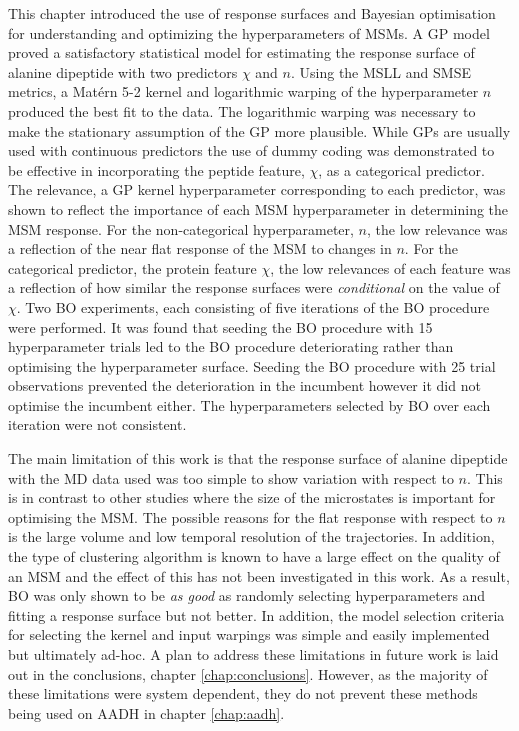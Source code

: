 This chapter introduced the use of response surfaces and Bayesian optimisation for understanding and optimizing the hyperparameters of MSMs. A GP model proved a satisfactory statistical model for estimating the response surface of alanine dipeptide with two predictors $\chi$ and $n$. Using the MSLL and SMSE metrics, a Mat\'{e}rn 5-2 kernel and logarithmic warping of the hyperparameter $n$ produced the best fit to the data.  The logarithmic warping was necessary to make the stationary assumption of the GP more plausible. While GPs are usually used with continuous predictors the use of dummy coding  was demonstrated to be effective in incorporating the peptide feature, $\chi$, as a categorical predictor. The relevance, a GP kernel hyperparameter corresponding to each predictor,  was shown to reflect the importance of each  MSM hyperparameter in determining the MSM response. For the non-categorical hyperparameter, $n$, the low relevance was a reflection of the near flat response of the MSM to changes in $n$. For the categorical predictor, the protein feature $\chi$, the low relevances of each feature was a reflection of how similar the response surfaces were \emph{conditional} on the value of $\chi$.  Two BO experiments, each consisting of five iterations of the BO procedure were performed. It was found that seeding the BO procedure with 15 hyperparameter trials led to the BO procedure deteriorating rather than optimising the hyperparameter surface. Seeding the BO procedure with 25 trial observations prevented the deterioration in the incumbent however it did not optimise the incumbent either. The hyperparameters selected by BO over each iteration were not consistent. 

The main limitation of this work is that the response surface of alanine dipeptide with the MD data used was too simple to show variation with respect to $n$. This is in contrast to other studies\cite{mcgibbonVariationalCrossvalidationSlow2015,wuVariationalApproachLearning2020c,prinzMarkovModelsMolecular2011} where the size of the microstates is important for optimising the MSM. The possible reasons for the flat response with respect to $n$ is the large volume and low temporal resolution of the trajectories. In addition, the type of clustering algorithm is known to have a large effect on the quality of an MSM\cite{husicWardClusteringImproves2017a} and the effect of this has not been investigated in this work. As a result, BO was only shown to be \emph{as good} as randomly selecting hyperparameters and fitting a response surface but not better. In addition, the model selection criteria for selecting the kernel and input warpings was simple and easily implemented but ultimately ad-hoc. A plan to address these limitations in future work is laid out in the conclusions, chapter \ref{chap:conclusions}. However, as the majority of these limitations were system dependent, they do not prevent these methods being used on AADH in chapter \ref{chap:aadh}. 

